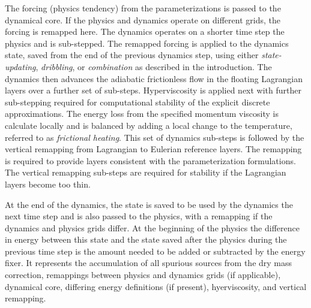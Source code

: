 \documentclass[draft,linenumbers]{agujournal}
\begin{document}
The forcing (physics tendency) from the parameterizations is passed to the dynamical core. If the physics and dynamics operate on different grids, the forcing is remapped here. The dynamics operates on a shorter time step the physics and is sub-stepped. The remapped forcing is applied to the dynamics state, saved from the end of the previous dynamics step, using either {\em{state-updating}}, {\em{dribbling}}, or {\em{combination}} as described in the introduction. The dynamics then advances the adiabatic frictionless flow in the floating Lagrangian layers over a further set of sub-steps. Hyperviscosity is applied next with further sub-stepping required for computational stability of the explicit discrete approximations. The energy loss from the specified momentum viscosity is calculate locally and is balanced by adding a local change to the temperature, referred to as {\em{frictional heating}}. This set of dynamics sub-steps is followed by the vertical remapping from Lagrangian to Eulerian reference layers. The remapping is required to provide layers consistent with the parameterization formulations. The vertical remapping sub-steps are required for stability if the Lagrangian layers become too thin.

At the end of the dynamics, the state is saved to be used by the dynamics the next time step and is also passed to the physics, with a remapping if the dynamics and physics grids differ. At the beginning of the physics the difference in energy between this state and the state saved after the physics during the previous time step is the amount needed to be added or subtracted by the energy fixer. It represents the accumulation of all spurious sources from the dry mass correction, remappings between physics and dynamics grids (if applicable), dynamical core, differing energy definitions (if present), hyerviscosity, and vertical remapping.
\end{document}
